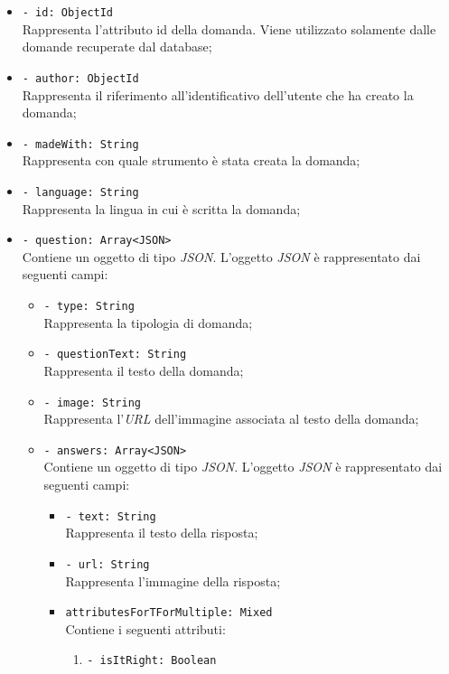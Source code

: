 \begin{itemize}
			\begin{itemize}
				\item \texttt{- id: ObjectId}\\
				Rappresenta l'attributo id della domanda. Viene utilizzato solamente dalle domande recuperate dal database;
				\item \texttt{- author: ObjectId}\\
				Rappresenta il riferimento all'identificativo dell'utente che ha creato la domanda;
				\item \texttt{- madeWith: String}\\ 
				Rappresenta con quale strumento è stata creata la domanda;
				\item \texttt{- language: String}\\
				Rappresenta la lingua in cui è scritta la domanda; 
				\item \texttt{- question: Array<JSON>}\\ 
				Contiene un oggetto di tipo \textit{JSON}. L'oggetto \textit{JSON} è rappresentato dai seguenti campi:
				\begin{itemize}
					\item \texttt{- type: String}\\
					Rappresenta la tipologia di domanda;
					\item \texttt{- questionText: String}\\ 
					Rappresenta il testo della domanda; 
					\item \texttt{- image: String}\\
					Rappresenta l'\textit{URL} dell'immagine associata al testo della domanda; 
					\item \texttt{- answers: Array<JSON>}\\ 
					Contiene un oggetto di tipo \textit{JSON}. L'oggetto \textit{JSON} è rappresentato dai seguenti campi:
					\begin{itemize}	 				  
						\item \texttt{- text: String}\\
						Rappresenta il testo della risposta;
						\item \texttt{- url: String}\\
						Rappresenta l'immagine della risposta;
						\item \texttt{attributesForTForMultiple: Mixed}\\
						Contiene i seguenti attributi:
						\begin{enumerate}
							\item \texttt{- isItRight: Boolean}\\

\end{enumerate}
\end{itemize}
\end{itemize}
\end{itemize}
\end{itemize}

